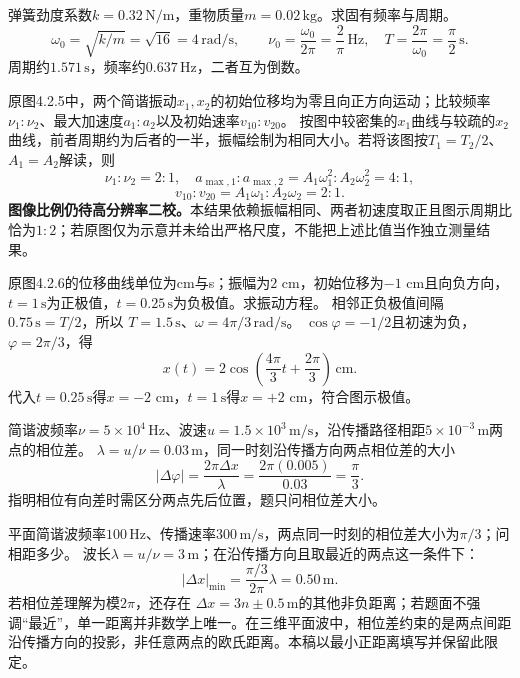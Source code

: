 \problemtext 弹簧劲度系数$k=0.32\,\mathrm{N/m}$，重物质量$m=0.02\,\mathrm{kg}$。求固有频率与周期。
\workings
\[
\omega_0=\sqrt{k/m}=\sqrt{16}=4\,\mathrm{rad/s},
\qquad
\boxed{\nu_0=\frac{\omega_0}{2\pi}=\frac2\pi\,\mathrm{Hz}},
\quad
\boxed{T=\frac{2\pi}{\omega_0}=\frac\pi2\,\mathrm s}.
\]
\crosscheck 周期约$1.571\,\mathrm s$，频率约$0.637\,\mathrm{Hz}$，二者互为倒数。

\problemtext 原图4.2.5中，两个简谐振动$x_1,x_2$的初始位移均为零且向正方向运动；比较频率$\nu_1:\nu_2$、最大加速度$a_1:a_2$以及初始速率$v_{10}:v_{20}$。
\workings
按图中较密集的$x_1$曲线与较疏的$x_2$曲线，前者周期约为后者的一半，振幅绘制为相同大小。若将该图按$T_1=T_2/2$、$A_1=A_2$解读，则
\[
\boxed{\nu_1:\nu_2=2:1},\quad
a_{\max,1}:a_{\max,2}
=A_1\omega_1^2:A_2\omega_2^2=\boxed{4:1},
\]
\[
\boxed{v_{10}:v_{20}=A_1\omega_1:A_2\omega_2=2:1}.
\]
\crosscheck \textbf{图像比例仍待高分辨率二校。}本结果依赖振幅相同、两者初速度取正且图示周期比恰为$1:2$；若原图仅为示意并未给出严格尺度，不能把上述比值当作独立测量结果。

\problemtext 原图4.2.6的位移曲线单位为cm与s；振幅为$2$ cm，初始位移为$-1$ cm且向负方向，$t=1\,\mathrm s$为正极值，$t=0.25\,\mathrm s$为负极值。求振动方程。
\workings
相邻正负极值间隔$0.75\,\mathrm s=T/2$，所以
$T=1.5\,\mathrm s$、$\omega=4\pi/3\,\mathrm{rad/s}$。
$\cos\varphi=-1/2$且初速为负，$\varphi=2\pi/3$，得
\[
\boxed{x(t)=2\cos\left(\frac{4\pi}{3}t+\frac{2\pi}{3}\right)\,\mathrm{cm}}.
\]
\crosscheck 代入$t=0.25\,\mathrm s$得$x=-2$ cm，$t=1\,\mathrm s$得$x=+2$ cm，符合图示极值。

\problemtext 简谐波频率$\nu=5\times10^4\,\mathrm{Hz}$、波速$u=1.5\times10^3\,\mathrm{m/s}$，沿传播路径相距$5\times10^{-3}\,\mathrm m$两点的相位差。
\workings
$\lambda=u/\nu=0.03\,\mathrm m$，同一时刻沿传播方向两点相位差的大小
\[
\boxed{|\Delta\varphi|=\frac{2\pi\Delta x}{\lambda}
=\frac{2\pi(0.005)}{0.03}=\frac\pi3}.
\]
\crosscheck 指明相位有向差时需区分两点先后位置，题只问相位差大小。

\problemtext 平面简谐波频率$100\,\mathrm{Hz}$、传播速率$300\,\mathrm{m/s}$，两点同一时刻的相位差大小为$\pi/3$；问相距多少。
\workings
波长$\lambda=u/\nu=3\,\mathrm m$；在沿传播方向且取最近的两点这一条件下：
\[
|\Delta x|_{\min}=\frac{\pi/3}{2\pi}\lambda
=\boxed{0.50\,\mathrm m}.
\]
\crosscheck 若相位差理解为模$2\pi$，还存在
$\Delta x=3n\pm0.5\,\mathrm m$的其他非负距离；若题面不强调“最近”，单一距离并非数学上唯一。在三维平面波中，相位差约束的是两点间距沿传播方向的投影，非任意两点的欧氏距离。本稿以最小正距离填写并保留此限定。

